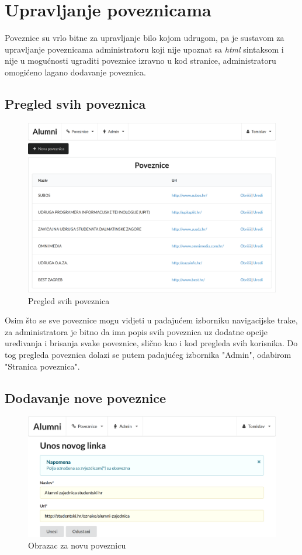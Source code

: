 \documentclass[zavrsni, numeric]{fer}
\begin{document}
\section{Upravljanje poveznicama}
Poveznice su vrlo bitne za upravljanje bilo kojom udrugom, pa je sustavom za upravljanje poveznicama administratoru koji nije upoznat sa \textit{html} sintaksom i nije u mogućnosti ugraditi poveznice izravno u kod stranice, administratoru omogićeno lagano dodavanje poveznica.

\subsection{Pregled svih poveznica}

\begin{figure}[H]
	\centering
	\includegraphics[width=13cm]{slike/poveznice.png}
	\caption{Pregled svih poveznica}
	\label{fig:poveznice}
\end{figure}

Osim što se sve poveznice mogu vidjeti u padajućem izborniku navigacijske trake, za administratora je bitno da ima popis svih poveznica uz dodatne opcije uređivanja i brisanja svake poveznice, slično kao i kod pregleda svih korisnika. Do tog pregleda poveznica dolazi se putem padajućeg izbornika "Admin", odabirom "Stranica poveznica".

\subsection{Dodavanje nove poveznice}

\begin{figure}[H]
	\centering
	\includegraphics[width=13cm]{slike/nova-poveznica.png}
	\caption{Obrazac za novu poveznicu}
	\label{fig:nova-poveznica}
\end{figure}
\end{document}
